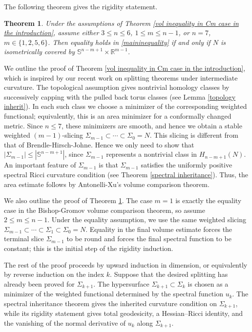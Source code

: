 \documentclass[11pt]{amsart}
\newtheorem{theorem}{Theorem}[section]
\theoremstyle{definition}
\theoremstyle{remark}
\numberwithin{equation}{section}
\begin{document}
The following theorem gives the rigidity statement.
\begin{theorem}\label{vol inequality in Cm case rigidity}
   Under the assumptions of Theorem \ref{vol inequality in Cm case in the introduction}, assume either
     \(3 \leq  n \leq  6\), \(1 \leq  m \leq  n-1\), or $n=7$, $m\in\{1,2,5,6\}$.
    Then equality holds in \eqref{maininequality} if and only if $N$ is isometrically covered by
      $\mathbb{S}^{n-m+1}\times \mathbb{R}^{m-1}$.
\end{theorem}

We outline the proof of Theorem \ref{vol inequality in Cm case in the introduction}, which is
  inspired by our recent work on splitting theorems under intermediate curvature. The
  topological assumption gives nontrivial homology classes by successively capping with the pulled
  back torus classes (see Lemma \ref{topology inherit}). In each such class we choose a minimizer of
  the corresponding weighted functional; equivalently, this is an area minimizer for a conformally
  changed metric. Since $n\leq7$, these minimizers are smooth, and hence we obtain a stable
  weighted $(m-1)$-slicing
  $\Sigma_{m-1}\subset \cdots\subset \Sigma_{0}=N$. This slicing is different from that of
  Brendle-Hirsch-Johne.
  Hence we only need to show that $|\Sigma_{m-1}|\leq
  |\mathbb{S}^{n-m+1}|$, since $\Sigma_{m-1}$ represents a nontrivial class in $H_{n-m+1}(N)$.
   An important feature of $\Sigma_{m-1}$ is that $\Sigma_{m-1}$ satisfies the
  uniformly positive spectral Ricci curvature condition (see Theorem \ref{spectral inheritance}).
  Thus, the area estimate follows by Antonelli-Xu's volume comparison theorem.

We also outline the proof of Theorem \ref{vol inequality in Cm case rigidity}. The case $m=1$ is
  exactly the equality case in the Bishop-Gromov volume comparison theorem, so assume
  $2\leq m\leq n-1$. Under the equality assumption, we use the same weighted slicing
  $\Sigma_{m-1}\subset\cdots\subset\Sigma_1\subset\Sigma_0=N$. Equality in the final volume
  estimate forces the terminal slice $\Sigma_{m-1}$ to be round and forces the final spectral
  function to be constant; this is the initial step of the rigidity induction.

The rest of the proof proceeds by upward induction in dimension, or equivalently by reverse
  induction on the index $k$. Suppose that the desired splitting has already been proved for
  $\Sigma_{k+1}$. The hypersurface $\Sigma_{k+1}\subset\Sigma_k$ is chosen as a minimizer of the
  weighted functional determined by the spectral function $u_k$. The spectral inheritance theorem
  gives the inherited curvature condition on $\Sigma_{k+1}$, while its rigidity statement gives
  total geodesicity, a Hessian--Ricci identity, and the vanishing of the normal derivative of
  $u_k$ along $\Sigma_{k+1}$.
\end{document}
